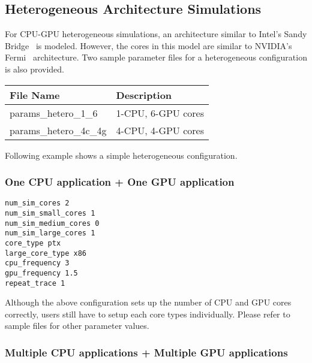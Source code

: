 \subsection{Heterogeneous Architecture Simulations}

For CPU-GPU heterogeneous simulations, an architecture similar to Intel's Sandy
Bridge~\cite{sandybridge} is modeled. However, the \gpu cores in this model are
similar to NVIDIA's Fermi~\cite{fermi} architecture. Two sample parameter files 
for a heterogeneous configuration is also provided.

\begin{center}
 \begin{tabular}{| l | l |}
  \hline
  File Name & Description \\ \hline \hline
  params\_hetero\_1\_6 &  1-CPU, 6-GPU cores \\
  params\_hetero\_4c\_4g &  4-CPU, 4-GPU cores \\
  \hline
 \end{tabular}
\end{center}

\noindent Following example shows a simple heterogeneous configuration.

\subsubsection*{One CPU application + One GPU application}

\begin{Verbatim}
num_sim_cores 2
num_sim_small_cores 1
num_sim_medium_cores 0
num_sim_large_cores 1
core_type ptx
large_core_type x86
cpu_frequency 3
gpu_frequency 1.5
repeat_trace 1
\end{Verbatim}


Although the above configuration sets up the number of CPU and GPU cores
correctly, users still have to setup each core types individually. Please refer
to sample files for other parameter values.

\subsubsection*{Multiple CPU applications + Multiple GPU applications}

